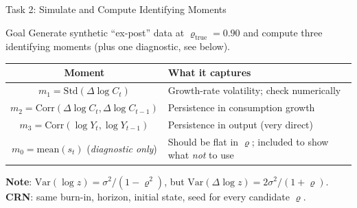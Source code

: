\documentclass[10pt,aspectratio=169]{beamer}
\begin{document}
\begin{frame}{Task 2: Simulate and Compute Identifying Moments}
\begin{block}{Goal}
Generate synthetic ``ex-post'' data at $\varrho_{\text{true}} = 0.90$ and compute three identifying moments (plus one diagnostic, see below).
\end{block}
\begin{center}\small
\begin{tabular}{cl}
\toprule
\textbf{Moment} & \textbf{What it captures} \\
\midrule
$m_1 = \mathrm{Std}(\Delta\log C_t)$               & Growth-rate volatility; check numerically \\
$m_2 = \mathrm{Corr}(\Delta\log C_t, \Delta\log C_{t-1})$ & Persistence in consumption growth \\
$m_3 = \mathrm{Corr}(\log Y_t, \log Y_{t-1})$       & Persistence in output (very direct) \\
\midrule
$m_0 = \mathrm{mean}(s_t)$ (\emph{diagnostic only}) & Should be flat in $\varrho$; included to show what \emph{not} to use \\
\bottomrule
\end{tabular}\end{center}
\vspace{0.15cm}
\textbf{Note}: $\mathrm{Var}(\log z)=\sigma^2/(1-\varrho^2)$, but $\mathrm{Var}(\Delta\log z)=2\sigma^2/(1+\varrho)$.\\[2pt]
\textbf{CRN}: same burn-in, horizon, initial state, seed for every candidate $\varrho$.
\end{frame}
\end{document}
